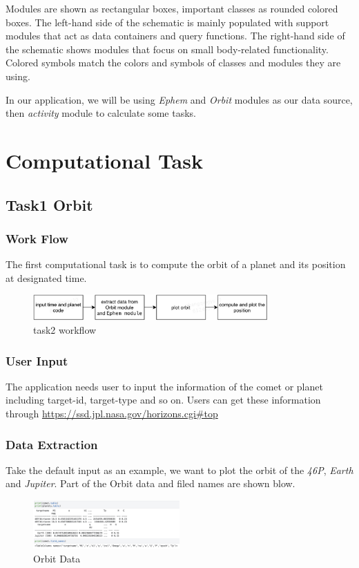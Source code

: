 \documentclass{report}
\begin{document}
Modules are shown as rectangular boxes, important classes as rounded colored boxes. The left-hand side of the schematic is mainly populated with support modules that act as data containers and query functions. The right-hand side of the schematic shows modules that focus on small body-related functionality. Colored symbols match the colors and symbols of classes and modules they are using.

In our application, we will be using \emph{Ephem} and \emph{Orbit} modules as our data source, then \emph{activity} module to calculate some tasks.

\chapter{Computational Task}
\section{Task1 Orbit}
\subsection{Work Flow}
The first computational task is to compute the orbit of a planet and its position at designated time.
\begin{figure}[htb]
    \centering
    \includegraphics[width=0.8\textwidth]{task1}
    \caption{task2 workflow}
    \label{fig:task2}
\end{figure}

\subsection{User Input}
The application needs user to input the information of the comet or planet including target-id, target-type and so on. Users can get these information through \url{https://ssd.jpl.nasa.gov/horizons.cgi#top}
\subsection{Data Extraction}
Take the default input as an example, we want to plot the orbit of the \emph{46P}, \emph{Earth} and \emph{Jupiter}.
Part of the Orbit data and filed names are shown blow.
\begin{figure}[htb]
    \centering
    \includegraphics[width=0.5\textwidth]{DataExtraction}
    \caption{Orbit Data}
    \label{fig:OrbitData}
\end{figure}
\end{document}
